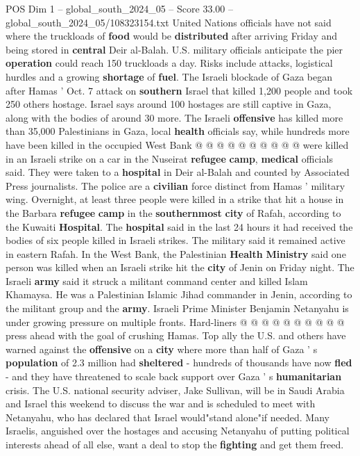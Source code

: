 \begin{textsample}{POS Dim 1 – global\_south\_2024\_05 – Score 33.00 – global\_south\_2024\_05/108323154.txt}
United Nations officials have not said where the truckloads of \textbf{food} would be \textbf{distributed} after arriving Friday and being stored in \textbf{central} Deir al-Balah.
U.S. military officials anticipate the pier \textbf{operation} could reach 150 truckloads a day.
Risks include attacks, logistical hurdles and a growing \textbf{shortage} of \textbf{fuel}.
The Israeli blockade of Gaza began after Hamas ' Oct. 7 attack on \textbf{southern} Israel that killed 1,200 people and took 250 others hostage.
Israel says around 100 hostages are still captive in Gaza, along with the bodies of around 30 more.
The Israeli \textbf{offensive} has killed more than 35,000 Palestinians in Gaza, local \textbf{health} officials say, while hundreds more have been killed in the occupied West Bank @ @ @ @ @ @ @ @ @ @ were killed in an Israeli strike on a car in the Nuseirat \textbf{refugee} \textbf{camp}, \textbf{medical} officials said.
They were taken to a \textbf{hospital} in Deir al-Balah and counted by Associated Press journalists.
The police are a \textbf{civilian} force distinct from Hamas ' military wing.
Overnight, at least three people were killed in a strike that hit a house in the Barbara \textbf{refugee} \textbf{camp} in the \textbf{southernmost} \textbf{city} of Rafah, according to the Kuwaiti \textbf{Hospital}.
The \textbf{hospital} said in the last 24 hours it had received the bodies of six people killed in Israeli strikes.
The military said it remained active in eastern Rafah.
In the West Bank, the Palestinian \textbf{Health} \textbf{Ministry} said one person was killed when an Israeli strike hit the \textbf{city} of Jenin on Friday night.
The Israeli \textbf{army} said it struck a militant command center and killed Islam Khamaysa.
He was a Palestinian Islamic Jihad commander in Jenin, according to the militant group and the \textbf{army}.
Israeli Prime Minister Benjamin Netanyahu is under growing pressure on multiple fronts.
Hard-liners @ @ @ @ @ @ @ @ @ @ press ahead with the goal of crushing Hamas.
Top ally the U.S. and others have warned against the \textbf{offensive} on a \textbf{city} where more than half of Gaza ' s \textbf{population} of 2.3 million had \textbf{sheltered} - hundreds of thousands have now \textbf{fled} - and they have threatened to scale back support over Gaza ' s \textbf{humanitarian} crisis.
The U.S. national security adviser, Jake Sullivan, will be in Saudi Arabia and Israel this weekend to discuss the war and is scheduled to meet with Netanyahu, who has declared that Israel would"stand alone"if needed.
Many Israelis, anguished over the hostages and accusing Netanyahu of putting political interests ahead of all else, want a deal to stop the \textbf{fighting} and get them freed.

\end{textsample}
